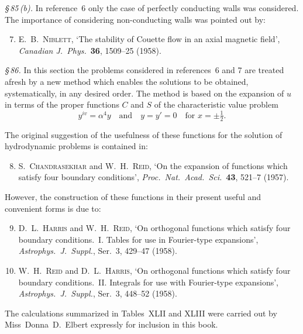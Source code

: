 \noindent\textit{\S\,85\,(b).} In reference~6 only the case of perfectly conducting walls was considered. The importance of considering non-conducting walls was pointed out by:

\begin{enumerate}
\setcounter{enumi}{6}
\item E.~B.~\textsc{Niblett}, `The stability of Couette flow in an axial magnetic field', \textit{Canadian J.\ Phys.}\ \textbf{36}, 1509--25 (1958).
\end{enumerate}

\noindent\textit{\S\,86.} In this section the problems considered in references~6 and 7 are treated afresh by a new method which enables the solutions to be obtained, systematically, in any desired order. The method is based on the expansion of $u$ in terms of the proper functions $C$ and $S$ of the characteristic value problem
\[
y^{iv} = \alpha^4 y \quad \text{and} \quad y = y' = 0 \quad \text{for } x = \pm\tfrac{1}{2}.
\]

The original suggestion of the usefulness of these functions for the solution of hydrodynamic problems is contained in:

\begin{enumerate}
\setcounter{enumi}{7}
\item S.~\textsc{Chandrasekhar} and W.~H.~\textsc{Reid}, `On the expansion of functions which satisfy four boundary conditions', \textit{Proc.\ Nat.\ Acad.\ Sci.}\ \textbf{43}, 521--7 (1957).
\end{enumerate}

\noindent However, the construction of these functions in their present useful and convenient forms is due to:

\begin{enumerate}
\setcounter{enumi}{8}
\item D.~L.~\textsc{Harris} and W.~H.~\textsc{Reid}, `On orthogonal functions which satisfy four boundary conditions.~I. Tables for use in Fourier-type expansions', \textit{Astrophys.\ J.\ Suppl.}, Ser.~3, 429--47 (1958).

\item W.~H.~\textsc{Reid} and D.~L.~\textsc{Harris}, `On orthogonal functions which satisfy four boundary conditions.~II. Integrals for use with Fourier-type expansions', \textit{Astrophys.\ J.\ Suppl.}, Ser.~3, 448--52 (1958).
\end{enumerate}

\noindent The calculations summarized in Tables~XLII and XLIII were carried out by Miss~Donna~D.~Elbert expressly for inclusion in this book.

